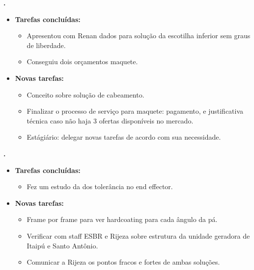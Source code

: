 					
			
   \textbf{.} 
	\begin{itemize}
		\item \textbf{Tarefas concluídas:}
			\begin{itemize}    
				\item Apresentou com Renan dados para solução da escotilha inferior sem
				graus de liberdade.
				\item Conseguiu dois orçamentos maquete.
				
			\end{itemize}
		
		\item \textbf{Novas tarefas:}
			\begin{itemize} 
			    \item Conceito sobre solução de cabeamento.
			    \item Finalizar o processo de serviço para maquete: pagamento, e
			    justificativa técnica caso não haja 3 ofertas disponíveis no mercado.
			    \item Estágiário: delegar novas tarefas de acordo com sua necessidade.
			\end{itemize}
	\end{itemize}

	  \textbf{\renan.} 
	\begin{itemize}
		\item \textbf{Tarefas concluídas:}
			\begin{itemize}    
				\item Fez um estudo da dos tolerância no end effector. 
			\end{itemize}
		
		\item \textbf{Novas tarefas:}
			\begin{itemize} 
			    \item Frame por frame para ver hardcoating para cada ângulo da pá.
			    \item Verificar com staff ESBR e Rijeza sobre estrutura da unidade
			    geradora de Itaipú e Santo Antônio.
			    \item Comunicar a Rijeza os pontos fracos e fortes de ambas soluções.
			\end{itemize}
	\end{itemize}	
	

